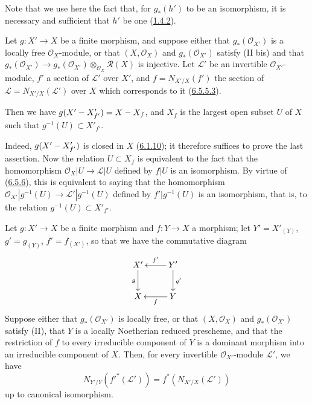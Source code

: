 Note that we use here the fact that, for $g_*(h')$ to be an isomorphism, it
is necessary and sufficient that $h'$ be one
(\hyperref[II.1.4.2]{1.4.2}).

\begin{corollary}[6.5.7]
\label{II.6.5.7}
Let $g:X'\to X$ be a finite morphism, and suppose either that
$g_*(\mathcal{O}_{X'})$ is a locally free $\mathcal{O}_X$-module, or that
$(X,\mathcal{O}_X)$ and $g_*(\mathcal{O}_{X'})$ satisfy \textup{(II bis)}
and that
$g_*(\mathcal{O}_{X'})\to
g_*(\mathcal{O}_{X'})\otimes_{\mathcal{O}_X}\mathcal{R}(X)$ is injective.
Let $\mathcal{L}'$ be an invertible $\mathcal{O}_{X'}$-module, $f'$ a
section of $\mathcal{L}'$ over $X'$, and $f=N_{X'/X}(f')$ the section of
$\mathcal{L}=N_{X'/X}(\mathcal{L}')$ over $X$ which corresponds to it
\textup{(\hyperref[II.6.5.5.3]{6.5.5.3})}.


Then we have $g(X'- X'_{f'})=X- X_f$, and $X_f$ is the largest open subset
$U$ of $X$ such that $g^{-1}(U)\subset X'_{f'}$.
\end{corollary}

Indeed, $g(X'- X'_{f'})$ is closed in $X$
(\hyperref[II.6.1.10]{6.1.10}); it therefore suffices to prove the last
assertion. Now the relation $U\subset X_f$ is equivalent to the fact that the
homomorphism $\mathcal{O}_X|U\to\mathcal{L}|U$ defined by $f|U$ is an
isomorphism. By virtue of (\hyperref[II.6.5.6]{6.5.6}), this is
equivalent to saying that the homomorphism
$\mathcal{O}_{X'}|g^{-1}(U)\to\mathcal{L}'|g^{-1}(U)$ defined by
$f'|g^{-1}(U)$ is an isomorphism, that is, to the relation
$g^{-1}(U)\subset X'_{f'}$.

\begin{proposition}[6.5.8]
\label{II.6.5.8}
Let $g:X'\to X$ be a finite morphism and $f:Y\to X$ a morphism; let
$Y'=X'_{(Y)}$, $g'=g_{(Y)}$, $f'=f_{(X')}$, so that we have the commutative
diagram
\[
\xymatrix{
X'\ar[d]_g & Y'\ar[l]_{f'}\ar[d]^{g'}\\
X & Y\ar[l]^f
}
\]
Suppose either that $g_*(\mathcal{O}_{X'})$ is locally free, or that
$(X,\mathcal{O}_X)$ and $g_*(\mathcal{O}_{X'})$ satisfy \textup{(II)}, that $Y$ is a
locally Noetherian reduced prescheme, and that the restriction of $f$ to
every irreducible component of $Y$ is a dominant morphism into an irreducible
component of $X$. Then, for every invertible $\mathcal{O}_{X'}$-module
$\mathcal{L}'$, we have
\[
N_{Y'/Y}({f'}^*(\mathcal{L}'))=f^*(N_{X'/X}(\mathcal{L}'))
\]
up to canonical isomorphism.
\end{proposition}

